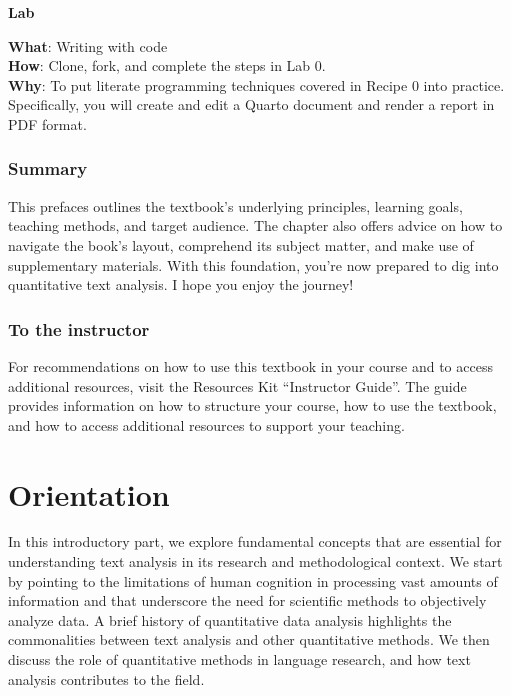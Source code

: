 \documentclass[
  letterpaper,
  krantz1]{latex/krantz-mod}
\theoremstyle{definition}
\theoremstyle{definition}
\theoremstyle{remark}
\begin{document}
\begin{tcolorbox}[enhanced jigsaw, leftrule=.75mm, colframe=quarto-callout-color-frame, left=2mm, colback=white, toprule=.15mm, breakable, arc=.35mm, opacityback=0, bottomrule=.15mm, rightrule=.15mm]

\textbf{ Lab}

\textbf{What}: Writing with code\\
\textbf{How}: Clone, fork, and complete the steps in Lab 0.\\
\textbf{Why}: To put literate programming techniques covered in Recipe 0
into practice. Specifically, you will create and edit a Quarto document
and render a report in PDF format.

\end{tcolorbox}

\section*{Summary}\label{sec-preface-summary}


This prefaces outlines the textbook's underlying principles, learning
goals, teaching methods, and target audience. The chapter also offers
advice on how to navigate the book's layout, comprehend its subject
matter, and make use of supplementary materials. With this foundation,
you're now prepared to dig into quantitative text analysis. I hope you
enjoy the journey!

\section*{To the instructor}\label{sec-preface-instructor}


For recommendations on how to use this textbook in your course and to
access additional resources, visit the Resources Kit ``Instructor
Guide''. The guide provides information on how to structure your course,
how to use the textbook, and how to access additional resources to
support your teaching.

\mainmatter

\part{Orientation}

In this introductory part, we explore fundamental concepts that are
essential for understanding text analysis in its research and
methodological context. We start by pointing to the limitations of human
cognition in processing vast amounts of information and that underscore
the need for scientific methods to objectively analyze data. A brief
history of quantitative data analysis highlights the commonalities
between text analysis and other quantitative methods. We then discuss
the role of quantitative methods in language research, and how text
analysis contributes to the field.
\end{document}
